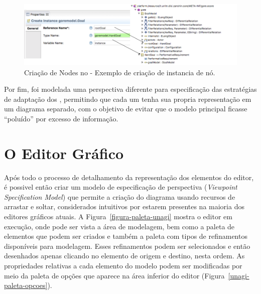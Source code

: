 \begin{figure}
	\centering
	\includegraphics[width=1\textwidth]{figuras/unagi/exemplo-propriedades-create-instance.png}
	\caption{Criação de Nodes no \sirius - Exemplo de criação de instancia de nó.}
	\label{figura-propriedades-create-instance}
\end{figure}

Por fim, foi modelada uma perspectiva diferente para especificação das estratégias de adaptação dos \awreqs, permitindo que cada um tenha sua propria representação em um diagrama separado, com o objetivo de evitar que o modelo principal ficasse ``poluído'' por excesso de informação. 

\section{O Editor Gráfico}
\label{sec-unagi-apresentacao-editor}

Após todo o processo de detalhamento da representação dos elementos do editor, é possivel então criar um modelo de especificação de perspectiva (\textit{Viewpoint Specification Model}) que permite a criação do diagrama usando recursos de arrastar e soltar, considerados intuitivos por estarem presentes na maioria dos editores gráficos atuais. A Figura~\ref{figura-paleta-unagi} mostra o editor em execução, onde pode ser vista a área de modelagem, bem como a paleta de elementos que podem ser criados e também a paleta com tipos de refinamentos disponíveis para modelagem. Esses refinamentos podem ser selecionados e então desenhados apenas clicando no elemento de origem e destino, nesta ordem. As propriedades relativas a cada elemento do modelo podem ser modificadas por meio da paleta de opções que aparece na área inferior do editor (Figura~\ref{unagi-paleta-opcoes}).

